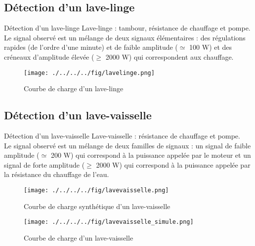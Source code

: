\documentclass{beamer}
\begin{document}
\subsection{Détection d'un lave-linge}
\begin{frame}{Détection d'un lave-linge}
Lave-linge : tambour, résistance de chauffage et pompe.\\
\vspace{0.25cm}
Le signal observé est un mélange de deux signaux élémentaires : des régulations rapides (de l'ordre d'une minute) et de faible amplitude ($\simeq$ 100 W) et des créneaux d'amplitude élevée ($\ge$ 2000 W) qui correspondent aux chauffage.
\end{frame}

\begin{frame}
\begin{figure}[!h]
\begin{center}
\texttt{[image: ./../../../fig/lavelinge.png]}
\caption{Courbe de charge d'un lave-linge}
\label{Figure13}
\end{center}
\end{figure}
\end{frame}

\subsection{Détection d'un lave-vaisselle}
\begin{frame}{Détection d'un lave-vaisselle}
Lave-vaisselle : résistance de chauffage et pompe.\\
\vspace{0.25cm}
Le signal observé est un mélange de deux familles de signaux : un signal de faible amplitude ($\simeq$ 200 W) qui correspond à la puissance appelée par le moteur et un signal de forte amplitude ($\ge$ 2000 W) qui correspond à la puissance appelée par la résistance du chauffage de l'eau.
\end{frame}

\begin{frame}
\begin{figure}[!h]
\begin{center}
\texttt{[image: ./../../../fig/lavevaisselle.png]}
\caption{Courbe de charge synthétique d'un lave-vaisselle}
\label{Figure14}
\end{center}
\end{figure}
\end{frame}

\begin{frame}
\begin{figure}[!h]
\begin{center}
\texttt{[image: ./../../../fig/lavevaisselle\_simule.png]}
\caption{Courbe de charge d'un lave-vaisselle}
\label{Figure15}
\end{center}
\end{figure}
\end{frame}
\end{document}
